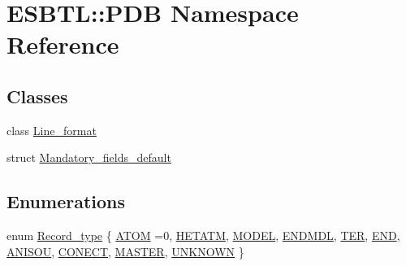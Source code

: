 \hypertarget{namespaceESBTL_1_1PDB}{}\section{E\+S\+B\+TL\+:\+:P\+DB Namespace Reference}
\label{namespaceESBTL_1_1PDB}
\subsection*{Classes}
\begin{DoxyCompactItemize}
\item 
class \hyperlink{classESBTL_1_1PDB_1_1Line__format}{Line\+\_\+format}
\item 
struct \hyperlink{structESBTL_1_1PDB_1_1Mandatory__fields__default}{Mandatory\+\_\+fields\+\_\+default}
\end{DoxyCompactItemize}
\subsection*{Enumerations}
\begin{DoxyCompactItemize}
\item 
enum \hyperlink{namespaceESBTL_1_1PDB_a6f11e88f706f51afbe97230641a469b7}{Record\+\_\+type} \{ \newline
\hyperlink{namespaceESBTL_1_1PDB_a6f11e88f706f51afbe97230641a469b7ae76b3a122dad316406fc1c7816408bb8}{A\+T\+OM} =0, 
\hyperlink{namespaceESBTL_1_1PDB_a6f11e88f706f51afbe97230641a469b7affc53bc49d345341456508ac2f2edb66}{H\+E\+T\+A\+TM}, 
\hyperlink{namespaceESBTL_1_1PDB_a6f11e88f706f51afbe97230641a469b7ab65bd08133b5b3bc45edcc279ea17691}{M\+O\+D\+EL}, 
\hyperlink{namespaceESBTL_1_1PDB_a6f11e88f706f51afbe97230641a469b7a7fbdf6a0178722ba790e43b51fd7c266}{E\+N\+D\+M\+DL}, 
\newline
\hyperlink{namespaceESBTL_1_1PDB_a6f11e88f706f51afbe97230641a469b7a84d674135bf0ea3ec08e920402ffbadb}{T\+ER}, 
\hyperlink{namespaceESBTL_1_1PDB_a6f11e88f706f51afbe97230641a469b7a9e600568c8b2d3043ae18011d3668406}{E\+ND}, 
\hyperlink{namespaceESBTL_1_1PDB_a6f11e88f706f51afbe97230641a469b7a1f1b71040413e3030225c3897c4c1ad1}{A\+N\+I\+S\+OU}, 
\hyperlink{namespaceESBTL_1_1PDB_a6f11e88f706f51afbe97230641a469b7a4a7f736670b0999d092c8c18e495043b}{C\+O\+N\+E\+CT}, 
\newline
\hyperlink{namespaceESBTL_1_1PDB_a6f11e88f706f51afbe97230641a469b7aa099f5b633abcf7d96d922bfa8ad59ce}{M\+A\+S\+T\+ER}, 
\hyperlink{namespaceESBTL_1_1PDB_a6f11e88f706f51afbe97230641a469b7ad9d8deb1f01f1b8b668a36e7fcf3b485}{U\+N\+K\+N\+O\+WN}
 \}
\end{DoxyCompactItemize}
